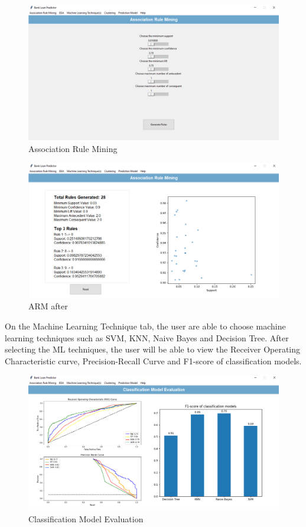\documentclass[11pt]{article}
\begin{document}
\begin{figure}[h]
\centerline{\includegraphics[scale=0.35]{deploy_arm.PNG}}
\label{fig:deployARM}
\caption{Association Rule Mining}
\end{figure}

\begin{figure}[h]
\centerline{\includegraphics[scale=0.35]{deploy_armResults.PNG}}
\label{fig:deployARM-2}
\caption{ARM after}
\end{figure}

\clearpage

On the Machine Learning Technique tab, the user are able to choose machine learning techniques such as SVM, KNN, Naive Bayes and Decision Tree. After selecting the ML techniques, the user will be able to view the Receiver Operating Characteristic curve, Precision-Recall Curve and F1-score of classification models.

\begin{figure}[h]
\centerline{\includegraphics[scale=0.35]{deploy_cme.PNG}}
\label{fig:deployCME}
\caption{Classification Model Evaluation}
\end{figure}
\end{document}
